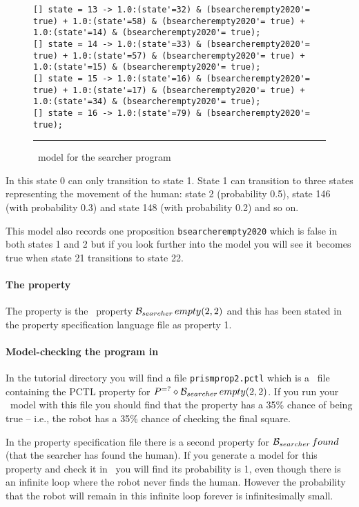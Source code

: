 \begin{figure}
\begin{small}
\begin{verbatim}
[] state = 13 -> 1.0:(state'=32) & (bsearcherempty2020'= true) + 1.0:(state'=58) & (bsearcherempty2020'= true) + 1.0:(state'=14) & (bsearcherempty2020'= true);
[] state = 14 -> 1.0:(state'=33) & (bsearcherempty2020'= true) + 1.0:(state'=57) & (bsearcherempty2020'= true) + 1.0:(state'=15) & (bsearcherempty2020'= true);
[] state = 15 -> 1.0:(state'=16) & (bsearcherempty2020'= true) + 1.0:(state'=17) & (bsearcherempty2020'= true) + 1.0:(state'=34) & (bsearcherempty2020'= true);
[] state = 16 -> 1.0:(state'=79) & (bsearcherempty2020'= true);
\end{verbatim}
\end{small}
\noindent\rule{\textwidth}{1pt}
\caption{\prism\ model for the searcher program}
\label{fig:prism_output2}
\end{figure}

In this state 0 can only transition to state 1.  State 1 can transition to three states representing the movement of the human: state 2 (probability 0.5), state 146 (with probability 0.3) and state 148 (with probability 0.2) and so on.

This model also records one proposition \texttt{bsearcherempty2020} which is false in both states 1 and 2 but if you look further into the model you will see it becomes true when state 21 transitions to state 22.

\paragraph{The property} The property is the \ajpf\ property $\mathrm{{\cal B}}_{searcher} \, empty(2, 2)$ and this has been stated in the property specification language file as property 1. 

\paragraph{Model-checking the program in \prism}  In the tutorial directory you will find a file \texttt{prismprop2.pctl} which is a \prism\ file containing the PCTL property for $P^{=?}\diamond \mathrm{{\cal B}}_{searcher} \, empty(2, 2)$.  If you run your \prism\ model with this file you should find that the property has a 35\% chance of being true -- i.e., the robot has a 35\% chance of checking the final square.

In the property specification file there is a second property for $\mathrm{{\cal B}}_{searcher} \, found$ (that the searcher has found the human).  If you generate a model for this property and check it in \prism\ you will find its probability is 1, even though there is an infinite loop where the robot never finds the human.   However the probability that the robot will remain in this infinite loop forever is infinitesimally small.


